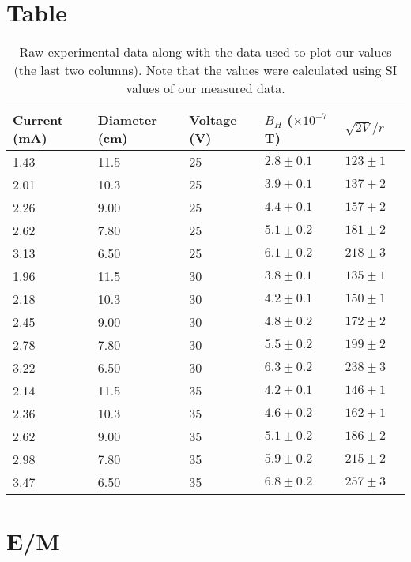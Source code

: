 \documentclass[12pt]{article}
\begin{document}
\section{Table}
\begin{table}[H]
    \centering
    \begin{tabularx}{\textwidth}{X X X X X X}
        \toprule
        \textbf{Current (mA)} & \textbf{Diameter (cm)} & \textbf{Voltage (V)} & \textbf{$B_H$ ($\times 10^{-7}$ T)} & \textbf{$\sqrt{2V}/r$} \\
        \midrule
        1.43 & 11.5 & 25 & $2.8 \pm 0.1$ & $123 \pm 1$ \\
        2.01 & 10.3 & 25 & $3.9 \pm 0.1$ & $137 \pm 2$ \\
        2.26 & 9.00 & 25 & $4.4 \pm 0.1$ & $157 \pm 2$ \\
        2.62 & 7.80 & 25 & $5.1 \pm 0.2$ & $181 \pm 2$ \\
        3.13 & 6.50 & 25 & $6.1 \pm 0.2$ & $218 \pm 3$ \\
        1.96 & 11.5 & 30 & $3.8 \pm 0.1$ & $135 \pm 1$ \\
        2.18 & 10.3 & 30 & $4.2 \pm 0.1$ & $150 \pm 1$ \\
        2.45 & 9.00 & 30 & $4.8 \pm 0.2$ & $172 \pm 2$ \\
        2.78 & 7.80 & 30 & $5.5 \pm 0.2$ & $199 \pm 2$ \\
        3.22 & 6.50 & 30 & $6.3 \pm 0.2$ & $238 \pm 3$ \\
        2.14 & 11.5 & 35 & $4.2 \pm 0.1$ & $146 \pm 1$ \\
        2.36 & 10.3 & 35 & $4.6 \pm 0.2$ & $162 \pm 1$ \\
        2.62 & 9.00 & 35 & $5.1 \pm 0.2$ & $186 \pm 2$ \\
        2.98 & 7.80 & 35 & $5.9 \pm 0.2$ & $215 \pm 2$ \\
        3.47 & 6.50 & 35 & $6.8 \pm 0.2$ & $257 \pm 3$ \\
        \bottomrule
    \end{tabularx}
    \caption{Raw experimental data along with the data used to plot our values (the last two columns). Note that the values were calculated using SI values of our measured data.}
    \label{tab:experimental_data}
\end{table}

\section{E/M}
\end{document}
